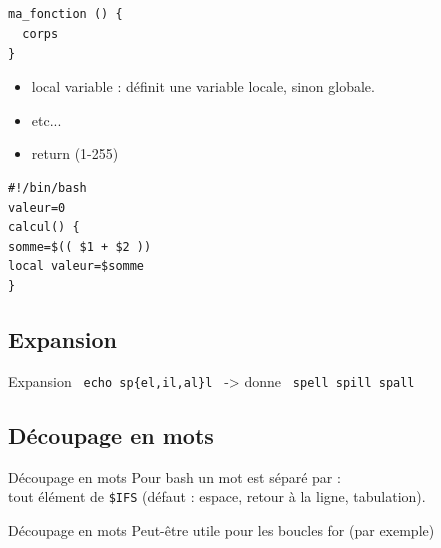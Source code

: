 \subsection{\subsectitle}
\begin{frame}[containsverbatim]{\sectitle}
\begin{block}{\subsectitle}
\begin{verbatim}
ma_fonction () {
  corps
}
\end{verbatim}
\end{block}

\begin{block}{\subsectitle}
\begin{itemize}
\item local variable : définit une variable locale, sinon globale.
\item {} etc...
\item return (1-255)

\end{itemize}
\end{block}

\begin{block}{\subsectitle}
\begin{verbatim}
#!/bin/bash
valeur=0
calcul() {
somme=$(( $1 + $2 ))
local valeur=$somme
}
\end{verbatim}

\end{block}
\end{frame}



\def\subsectitle{Expansion}
\subsection{\subsectitle}
\begin{frame}[containsverbatim]{\sectitle}
\begin{block}{\subsectitle}
\verb! echo sp{el,il,al}l ! -> donne \verb! spell spill spall!
\end{block}
\end{frame}

\def\subsectitle{Découpage en mots}
\subsection{\subsectitle}
\begin{frame}[containsverbatim]{\sectitle}
\begin{block}{\subsectitle}
Pour bash un mot est séparé par :\\
tout élément de \verb!$IFS! (défaut : espace, retour à la ligne, tabulation).%
\end{block}

\begin{block}{\subsectitle}
Peut-être utile pour les boucles for (par exemple)
\end{block}

\end{frame}



